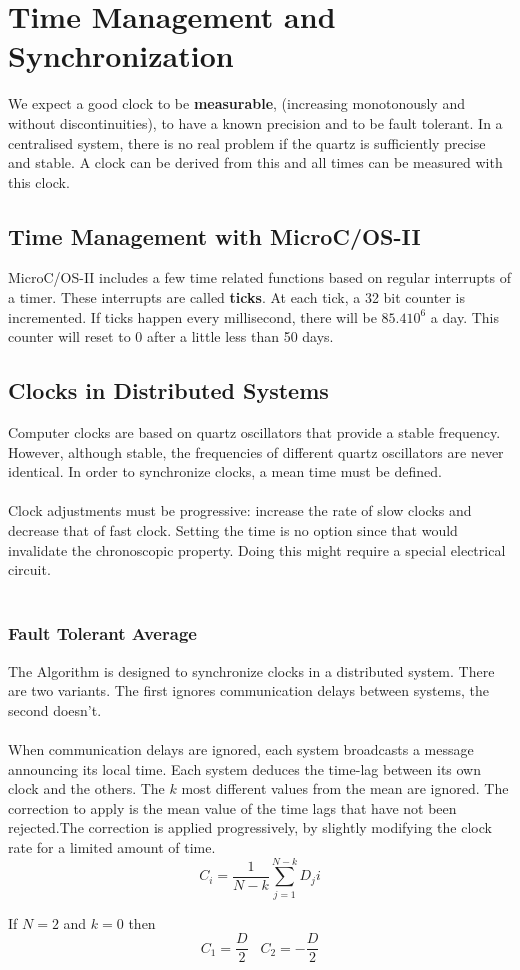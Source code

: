 \documentclass[../main.tex]{subfiles}
\begin{document}
\section{Time Management and Synchronization}
We expect a good clock to be \textbf{measurable},  (increasing monotonously and without discontinuities), to have a known precision and to be fault tolerant. In a centralised system, there is no real problem if the quartz is sufficiently precise and stable. A clock can be derived from this and all times can be measured with this clock.

\subsection{ Time Management with MicroC/OS-II}
MicroC/OS-II includes a few time related functions based on regular interrupts of a timer. These interrupts are called \textbf{ticks}. At each tick, a 32 bit counter is incremented. If ticks happen every millisecond, there will be $85.4 10^6$ a day. This counter will reset to 0 after a little less than 50 days.

\subsection{Clocks in Distributed Systems}
Computer clocks are based on quartz oscillators that provide a stable frequency.
However, although stable, the frequencies of different quartz oscillators are never identical.
In order to  synchronize clocks, a mean time must be defined.
\\\\
Clock adjustments must be progressive: increase the rate of slow clocks and decrease that of fast clock. Setting the time is no option since that would invalidate the chronoscopic property. Doing this might require a special electrical circuit.
\\\\
\subsubsection{Fault Tolerant Average}
The  Algorithm is designed to synchronize clocks in a distributed system. There are two variants. The first ignores communication delays between systems, the second doesn't.
\\\\
When communication delays are ignored, each system broadcasts a message announcing its local time. Each system deduces the time-lag between its own clock and the others. The $k$ most different values from the mean are ignored. The correction to apply is the mean value of the time lags that have not been rejected.The correction is applied progressively, by slightly modifying the clock rate for a limited amount of time.
\[
C_i = \frac{1}{N-k}\sum^{N-k}_{j=1}D_ji
\]
\begin{exmp}
If $N = 2$ and $k=0$ then
\[
C_1 = \frac{D}{2} \;\;\; C_2 = -\frac{D}{2}
\]
\end{exmp}
\end{document}
